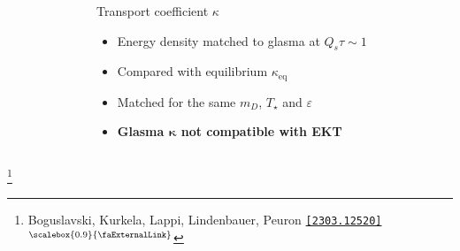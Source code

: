 \documentclass[aspectratio=169,11pt,usenames,dvipsnames]{beamer}
\renewcommand{\thefootnote}{\color{customblue}\faPaperPlaneO}
\newcommand\blfootnote[1]{%
  \begingroup
  \renewcommand\thefootnote{}\footnote{#1}%
  \addtocounter{footnote}{-1}%
  \endgroup
}
\begin{document}
\begin{frame}[t,noframenumbering]
\begin{columns}[onlytextwidth,t]
\begin{figure}
        \end{figure}
        \begin{center}
            {\Large\color{isgold} Transport coefficient $\kappa$\\[10pt]}
            \footnotesize
                \begin{itemize}
                    \item {\color{lightgray}Energy density matched to glasma at $Q_s\tau\sim 1$}
                    \item {\color{lightgray}Compared with equilibrium $\kappa_{\mathrm{eq}}$}
                    \item {\color{lightgray}Matched for the same $m_D$, $T_{\star}$ and $\varepsilon$}\\[15pt]
                    \item {\color{destacado}\bfseries\normalsize{Glasma $\boldsymbol{\kappa}$ not compatible with EKT}}
                \end{itemize}
        \end{center}
    \end{columns}
    \blfootnote{\scriptsize Boguslavski, Kurkela, Lappi, Lindenbauer, Peuron \href{https://arxiv.org/abs/2303.12520}{{\color{isgold}\texttt{[2303.12520]}$^\text{\scalebox{0.9}{\faExternalLink}}$}}}
\end{frame}

\end{document}
